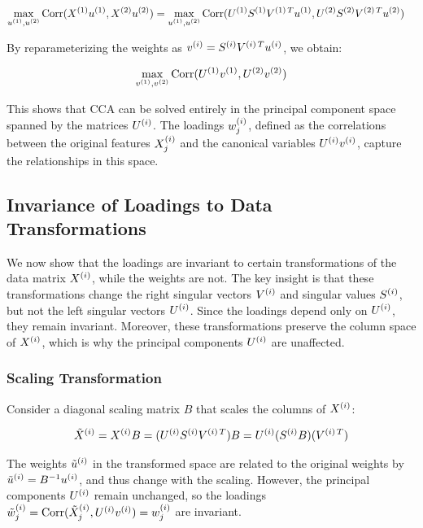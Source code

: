 \begin{align}
\max_{u^{(1)}, u^{(2)}} \operatorname{Corr}(X^{(1)}u^{(1)}, X^{(2)}u^{(2)}) &= \max_{u^{(1)}, u^{(2)}} \operatorname{Corr}(U^{(1)}S^{(1)}V^{(1)\,T}u^{(1)}, U^{(2)}S^{(2)}V^{(2)\,T}u^{(2)}) \label{eq:cca_obj}
\end{align}

By reparameterizing the weights as $v^{(i)} = S^{(i)}V^{(i)\,T}u^{(i)}$, we obtain:

\begin{align}
\max_{v^{(1)}, v^{(2)}} \operatorname{Corr}(U^{(1)}v^{(1)}, U^{(2)}v^{(2)}) \label{eq:reparam}
\end{align}

This shows that CCA can be solved entirely in the principal component space spanned by the matrices $U^{(i)}$. The loadings $w^{(i)}_j$, defined as the correlations between the original features $X^{(i)}_j$ and the canonical variables $U^{(i)}v^{(i)}$, capture the relationships in this space.

\subsection{Invariance of Loadings to Data Transformations}

We now show that the loadings are invariant to certain transformations of the data matrix $X^{(i)}$, while the weights are not. The key insight is that these transformations change the right singular vectors $V^{(i)}$ and singular values $S^{(i)}$, but not the left singular vectors $U^{(i)}$. Since the loadings depend only on $U^{(i)}$, they remain invariant. Moreover, these transformations preserve the column space of $X^{(i)}$, which is why the principal components $U^{(i)}$ are unaffected.

\subsubsection{Scaling Transformation}
Consider a diagonal scaling matrix $B$ that scales the columns of $X^{(i)}$:

\begin{align}
\tilde{X}^{(i)} = X^{(i)}B = (U^{(i)}S^{(i)}V^{(i)\,T})B = U^{(i)}(S^{(i)}B)(V^{(i)\,T}) \label{eq:scaling}
\end{align}

The weights $\tilde{u}^{(i)}$ in the transformed space are related to the original weights by $\tilde{u}^{(i)} = B^{-1}u^{(i)}$, and thus change with the scaling. However, the principal components $U^{(i)}$ remain unchanged, so the loadings $\tilde{w}^{(i)}_j = \operatorname{Corr}(\tilde{X}^{(i)}_j, U^{(i)}v^{(i)}) = w^{(i)}_j$ are invariant.

